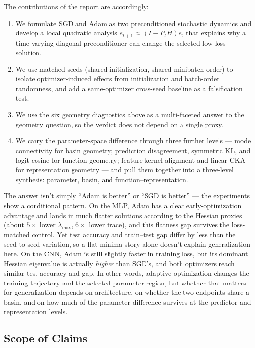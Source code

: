 \documentclass[11pt]{article}
\begin{document}
The contributions of the report are accordingly:
\begin{enumerate}
\item We formulate SGD and Adam as two preconditioned stochastic dynamics and develop a local quadratic analysis $e_{t+1}\approx (I-P_tH)e_t$ that explains why a time-varying diagonal preconditioner can change the selected low-loss solution.
\item We use matched seeds (shared initialization, shared minibatch order) to isolate optimizer-induced effects from initialization and batch-order randomness, and add a same-optimizer cross-seed baseline as a falsification test.
\item We use the six geometry diagnostics above as a multi-faceted answer to the geometry question, so the verdict does not depend on a single proxy.
\item We carry the parameter-space difference through three further levels --- mode connectivity for basin geometry; prediction disagreement, symmetric KL, and logit cosine for function geometry; feature-kernel alignment and linear CKA for representation geometry --- and pull them together into a three-level synthesis: parameter, basin, and function--representation.
\end{enumerate}

The answer isn't simply ``Adam is better'' or ``SGD is better'' --- the experiments show a conditional pattern. On the MLP, Adam has a clear early-optimization advantage and lands in much flatter solutions according to the Hessian proxies (about $5\times$ lower $\lambda_{\max}$, $6\times$ lower trace), and this flatness gap survives the loss-matched control. Yet test accuracy and train--test gap differ by less than the seed-to-seed variation, so a flat-minima story alone doesn't explain generalization here. On the CNN, Adam is still slightly faster in training loss, but its dominant Hessian eigenvalue is actually \emph{higher} than SGD's, and both optimizers reach similar test accuracy and gap. In other words, adaptive optimization changes the training trajectory and the selected parameter region, but whether that matters for generalization depends on architecture, on whether the two endpoints share a basin, and on how much of the parameter difference survives at the predictor and representation levels.

\subsection{Scope of Claims}
\end{document}
